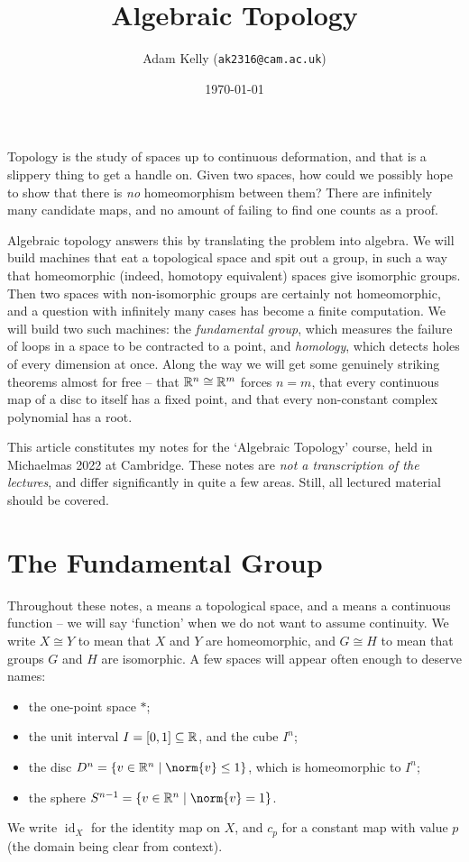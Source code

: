 \documentclass[a4paper]{scrartcl}
\title{Algebraic Topology}
\author{Adam Kelly (\texttt{ak2316@cam.ac.uk})}
\date{\today}
\newcommand{\id}{\operatorname{id}}
\begin{document}
\maketitle

Topology is the study of spaces up to continuous deformation, and that is a slippery
thing to get a handle on. Given two spaces, how could we possibly hope to show that
there is \emph{no} homeomorphism between them? There are infinitely many candidate maps,
and no amount of failing to find one counts as a proof.

Algebraic topology answers this by translating the problem into algebra. We will build
machines that eat a topological space and spit out a group, in such a way that
homeomorphic (indeed, homotopy equivalent) spaces give isomorphic groups. Then two
spaces with non-isomorphic groups are certainly not homeomorphic, and a question with
infinitely many cases has become a finite computation. We will build two such machines:
the \emph{fundamental group}, which measures the failure of loops in a space to be
contracted to a point, and \emph{homology}, which detects holes of every dimension at
once. Along the way we will get some genuinely striking theorems almost for free --
that $\mathbb{R}^n \cong \mathbb{R}^m$ forces $n = m$, that every continuous map of a disc to itself has
a fixed point, and that every non-constant complex polynomial has a root.

This article constitutes my notes for the `Algebraic Topology' course, held in Michaelmas
2022 at Cambridge. These notes are \emph{not a transcription of the lectures}, and differ
significantly in quite a few areas. Still, all lectured material should be covered.

\tableofcontents

\section{The Fundamental Group}

Throughout these notes, a  means a topological space, and a 
means a continuous function -- we will say `function' when we do not want to assume
continuity. We write $X \cong Y$ to mean that $X$ and $Y$ are homeomorphic, and $G \cong H$
to mean that groups $G$ and $H$ are isomorphic. A few spaces will appear often enough to
deserve names:
\begin{itemize}
	\item the one-point space $*$;
	\item the unit interval $I = [0,1] \subseteq \mathbb{R}$, and the cube $I^n$;
	\item the disc $D^n = \{ v \in \R^n \mid \norm{v} \leq 1\}$, which is homeomorphic to $I^n$;
	\item the sphere $S^{n-1} = \{v \in \R^n \mid \norm{v} = 1\}$.
\end{itemize}
We write $\id_X$ for the identity map on $X$, and $c_p$ for a constant map with value $p$
(the domain being clear from context).
\end{document}

